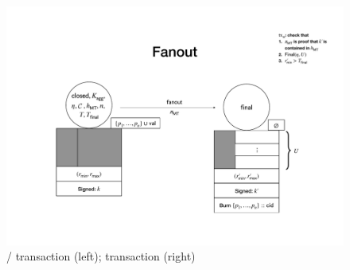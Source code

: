 \begin{figure}[t!]

  \centering


  \includegraphics[width=\textwidth/2]{figures/SM_closed_final.pdf}

  \caption{\mtxClose{}/\mtxContest{} transaction (left);
    \mtxFanout{} transaction (right)}
  \label{fig:SM_closed_final}

\end{figure}



